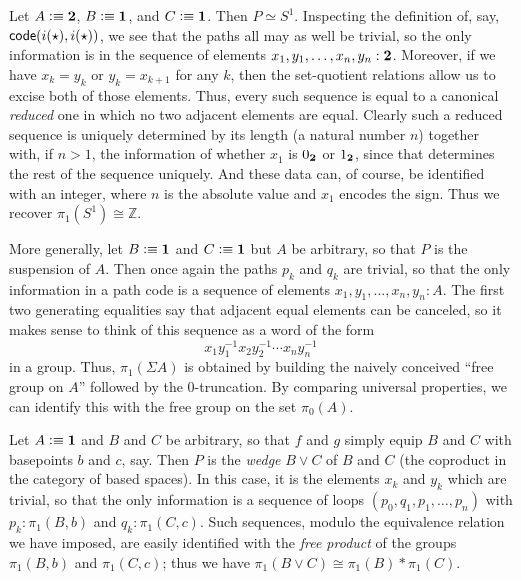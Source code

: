 \begin{eg}\label{eg:circle}
  Let $A\vcentcolon\equiv \mathbf{2}$, $B\vcentcolon\equiv\mathbf{1}$, and $C\vcentcolon\equiv \mathbf{1}$.
  Then $P \simeq S^1$.
  Inspecting the definition of, say, $\mathsf{code}(i(\star),i(\star))$, we see that the paths all may as well be trivial, so the only information is in the sequence of elements $x_1,y_1,\dots,x_n,y_n: \mathbf{2}$.
  Moreover, if we have $x_k=y_k$ or $y_k=x_{k+1}$ for any $k$, then the set-quotient relations allow us to excise both of those elements.
  Thus, every such sequence is equal to a canonical \emph{reduced} one in which no two adjacent elements are equal.
  Clearly such a reduced sequence is uniquely determined by its length (a natural number $n$) together with, if $n>1$, the information of whether $x_1$ is $0_{\mathbf{2}}$ or $1_{\mathbf{2}}$, since that determines the rest of the sequence uniquely.
  And these data can, of course, be identified with an integer, where $n$ is the absolute value and $x_1$ encodes the sign.
  Thus we recover $\pi_1(S^1)\cong \mathbb{Z}$.
\end{eg}

\begin{eg}\label{eg:suspension}
  More generally, let $B\vcentcolon\equiv\mathbf{1}$ and $C\vcentcolon\equiv \mathbf{1}$ but $A$ be arbitrary, so that $P$ is the suspension of $A$.
  Then once again the paths $p_k$ and $q_k$ are trivial, so that the only information in a path code is a sequence of elements $x_1,y_1,\dots,x_n,y_n: A$.
  The first two generating equalities say that adjacent equal elements can be canceled, so it makes sense to think of this sequence as a word of the form
  \[ x_1 y_1^{-1} x_2 y_2^{-1} \cdots x_n y_n^{-1} \]
  in a group.
  Thus, $\pi_1(\Sigma A)$ is obtained by building the naively conceived ``free group on $A$'' followed by the 0-truncation.
  By comparing universal properties, we can identify this with the free group on the set $\pi_0(A)$.
\end{eg}

\begin{eg}\label{eg:wedge}
  Let $A\vcentcolon\equiv\mathbf{1}$ and $B$ and $C$ be arbitrary, so that $f$ and $g$ simply equip $B$ and $C$ with basepoints $b$ and $c$, say.
  Then $P$ is the \emph{wedge} $B\vee C$ of $B$ and $C$ (the coproduct in the category of based spaces).
  In this case, it is the elements $x_k$ and $y_k$ which are trivial, so that the only information is a sequence of loops $(p_0,q_1,p_1,\dots,p_n)$ with $p_k:\pi_1(B,b)$ and $q_k:\pi_1(C,c)$.
  Such sequences, modulo the equivalence relation we have imposed, are easily identified with the \emph{free product} of the groups $\pi_1(B,b)$ and $\pi_1(C,c)$; thus we have $\pi_1(B\vee C) \cong \pi_1(B) * \pi_1(C)$.
\end{eg}

